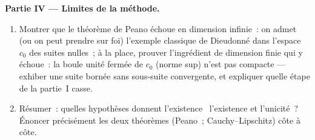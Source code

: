 \begin{problem}[{Problème de fin de semaine --- existence de
solutions de $x' = f(t, x)$ sans Lipschitz}]
\medskip
\noindent\textbf{Partie IV --- Limites de la méthode.}
\begin{enumerate}[resume]
  \item Montrer que le théorème de Peano échoue en dimension
        infinie~: on admet (ou on peut prendre sur foi)
        l'exemple classique de Dieudonné dans l'espace $c_0$
        des suites nulles~; à la place, prouver l'ingrédient
        de dimension finie qui y échoue~: la boule unité
        fermée de $c_0$ (norme sup) n'est pas compacte ---
        exhiber une suite bornée sans sous-suite convergente,
        et expliquer quelle étape de la partie~I casse.
  \item Résumer~: quelles hypothèses donnent l'existence~
        l'existence et l'unicité~? Énoncer précisément les
        deux théorèmes (Peano~; Cauchy--Lipschitz) côte à
        côte.
\end{enumerate}


\end{problem}
